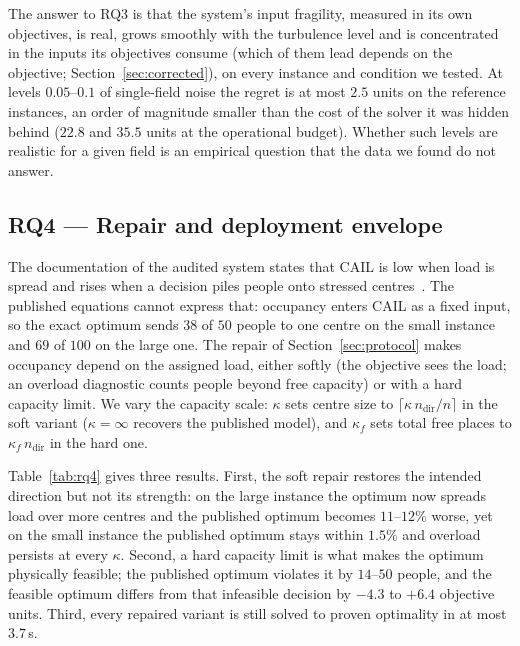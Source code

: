 \documentclass[systems,article,submit,moreauthors,pdftex]{Definitions/mdpi}
\begin{document}
The answer to RQ3 is that the system's input fragility, measured in its own objectives, is real,
grows smoothly with the turbulence level and is concentrated in the inputs its objectives consume
(which of them lead depends on the objective; Section~\ref{sec:corrected}),
on every instance and condition we tested. At levels $0.05$--$0.1$ of single-field noise the regret
is at most $2.5$ units on the reference instances, an order of magnitude smaller than the cost of
the solver it was hidden behind ($22.8$ and $35.5$ units at the operational budget). Whether such
levels are realistic for a given field is an empirical question that the data we found do not
answer.

\subsection{RQ4 --- Repair and deployment envelope}\label{sec:rq4}
The documentation of the audited system states that CAIL is low when load is spread and
rises when a decision piles people onto stressed centres~\cite{rabiei2026resilient}. The
published equations cannot express that: occupancy enters CAIL as a fixed input, so the
exact optimum sends $38$ of $50$ people to one centre on the small instance and $69$ of
$100$ on the large one. The repair of Section~\ref{sec:protocol} makes occupancy depend on
the assigned load, either softly (the objective sees the load; an overload diagnostic counts
people beyond free capacity) or with a hard capacity limit. We vary the capacity scale:
$\kappa$ sets centre size to $\lceil\kappa\, n_{\mathrm{dir}}/n\rceil$ in the soft variant
($\kappa = \infty$ recovers the published model), and $\kappa_f$ sets total free places to
$\kappa_f\, n_{\mathrm{dir}}$ in the hard one.

Table~\ref{tab:rq4} gives three results. First, the soft repair restores the intended
direction but not its strength: on the large instance the optimum now spreads load over more
centres and the published optimum becomes $11$--$12\%$ worse, yet on the small instance the
published optimum stays within $1.5\%$ and overload persists at every $\kappa$. Second, a hard
capacity limit is what makes the optimum physically feasible; the published optimum violates it
by $14$--$50$ people, and the feasible optimum differs from that infeasible decision by $-4.3$ to
$+6.4$ objective units. Third, every repaired variant is still solved to proven optimality in at
most $3.7$\,s.
\end{document}
